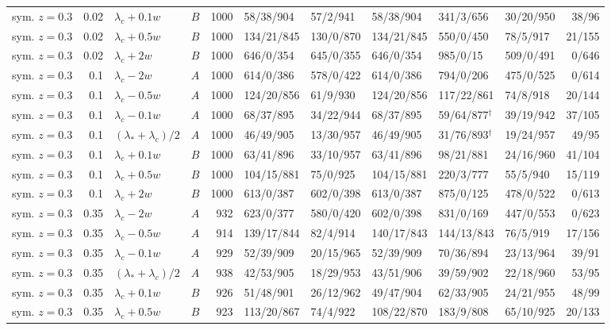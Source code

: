 \begin{longtable}{@{}lrllrlllllr@{}}
sym. $z{=}0.3$ & 0.02 & $\lambda_c+0.1w$ & $B$ & 1000 & 58/38/904 & 57/2/941 & 58/38/904 & 341/3/656 & 30/20/950 & 38/96\\
sym. $z{=}0.3$ & 0.02 & $\lambda_c+0.5w$ & $B$ & 1000 & 134/21/845 & 130/0/870 & 134/21/845 & 550/0/450 & 78/5/917 & 21/155\\
sym. $z{=}0.3$ & 0.02 & $\lambda_c+2w$ & $B$ & 1000 & 646/0/354 & 645/0/355 & 646/0/354 & 985/0/15 & 509/0/491 & 0/646\\
sym. $z{=}0.3$ & 0.1 & $\lambda_c-2w$ & $A$ & 1000 & 614/0/386 & 578/0/422 & 614/0/386 & 794/0/206 & 475/0/525 & 0/614\\
sym. $z{=}0.3$ & 0.1 & $\lambda_c-0.5w$ & $A$ & 1000 & 124/20/856 & 61/9/930 & 124/20/856 & 117/22/861 & 74/8/918 & 20/144\\
sym. $z{=}0.3$ & 0.1 & $\lambda_c-0.1w$ & $A$ & 1000 & 68/37/895 & 34/22/944 & 68/37/895 & 59/64/877$^\dagger$ & 39/19/942 & 37/105\\
sym. $z{=}0.3$ & 0.1 & $(\lambda_*+\lambda_c)/2$ & $A$ & 1000 & 46/49/905 & 13/30/957 & 46/49/905 & 31/76/893$^\dagger$ & 19/24/957 & 49/95\\
sym. $z{=}0.3$ & 0.1 & $\lambda_c+0.1w$ & $B$ & 1000 & 63/41/896 & 33/10/957 & 63/41/896 & 98/21/881 & 24/16/960 & 41/104\\
sym. $z{=}0.3$ & 0.1 & $\lambda_c+0.5w$ & $B$ & 1000 & 104/15/881 & 75/0/925 & 104/15/881 & 220/3/777 & 55/5/940 & 15/119\\
sym. $z{=}0.3$ & 0.1 & $\lambda_c+2w$ & $B$ & 1000 & 613/0/387 & 602/0/398 & 613/0/387 & 875/0/125 & 478/0/522 & 0/613\\
sym. $z{=}0.3$ & 0.35 & $\lambda_c-2w$ & $A$ & 932 & 623/0/377 & 580/0/420 & 602/0/398 & 831/0/169 & 447/0/553 & 0/623\\
sym. $z{=}0.3$ & 0.35 & $\lambda_c-0.5w$ & $A$ & 914 & 139/17/844 & 82/4/914 & 140/17/843 & 144/13/843 & 76/5/919 & 17/156\\
sym. $z{=}0.3$ & 0.35 & $\lambda_c-0.1w$ & $A$ & 929 & 52/39/909 & 20/15/965 & 52/39/909 & 70/36/894 & 23/13/964 & 39/91\\
sym. $z{=}0.3$ & 0.35 & $(\lambda_*+\lambda_c)/2$ & $A$ & 938 & 42/53/905 & 18/29/953 & 43/51/906 & 39/59/902 & 22/18/960 & 53/95\\
sym. $z{=}0.3$ & 0.35 & $\lambda_c+0.1w$ & $B$ & 926 & 51/48/901 & 26/12/962 & 49/47/904 & 62/33/905 & 24/21/955 & 48/99\\
sym. $z{=}0.3$ & 0.35 & $\lambda_c+0.5w$ & $B$ & 923 & 113/20/867 & 74/4/922 & 108/22/870 & 183/9/808 & 65/10/925 & 20/133\\

\end{longtable}
